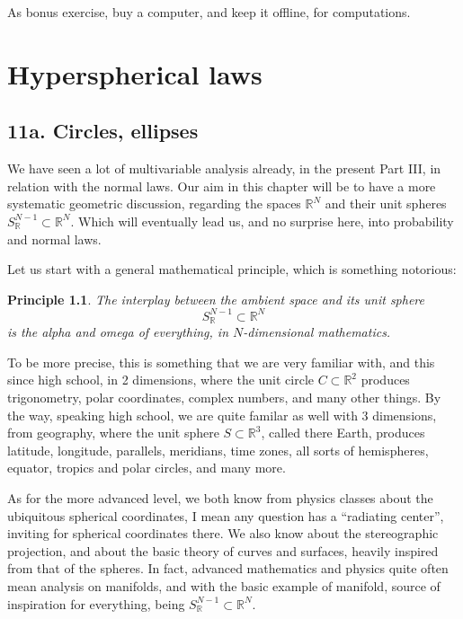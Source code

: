 \documentclass[12pt]{amsbook}
\newtheorem{principle}[theorem]{Principle}
\begin{document}
As bonus exercise, buy a computer, and keep it offline, for computations.

\chapter{Hyperspherical laws}

\section*{11a. Circles, ellipses}

We have seen a lot of multivariable analysis already, in the present Part III, in relation with the normal laws. Our aim in this chapter will be to have a more systematic geometric discussion, regarding the spaces $\mathbb R^N$ and their unit spheres $S^{N-1}_\mathbb R\subset\mathbb R^N$. Which will eventually lead us, and no surprise here, into probability and normal laws.

\bigskip

Let us start with a general mathematical principle, which is something notorious:

\begin{principle}
The interplay between the ambient space and its unit sphere
$$S^{N-1}_\mathbb R\subset\mathbb R^N$$
is the alpha and omega of everything, in $N$-dimensional mathematics.
\end{principle}

To be more precise, this is something that we are very familiar with, and this since high school, in 2 dimensions, where the unit circle $C\subset\mathbb R^2$ produces trigonometry, polar coordinates, complex numbers, and many other things. By the way, speaking high school, we are quite familar as well with 3 dimensions, from geography, where the unit sphere $S\subset\mathbb R^3$, called there Earth, produces latitude, longitude, parallels, meridians, time zones, all sorts of hemispheres, equator, tropics and polar circles, and many more.

\bigskip

As for the more advanced level, we both know from physics classes about the ubiquitous spherical coordinates, I mean any question has a ``radiating center'', inviting for spherical coordinates there. We also know about the stereographic projection, and about the basic theory of curves and surfaces, heavily inspired from that of the spheres. In fact, advanced mathematics and physics quite often mean analysis on manifolds, and with the basic example of manifold, source of inspiration for everything, being $S^{N-1}_\mathbb R\subset\mathbb R^N$.
\end{document}
